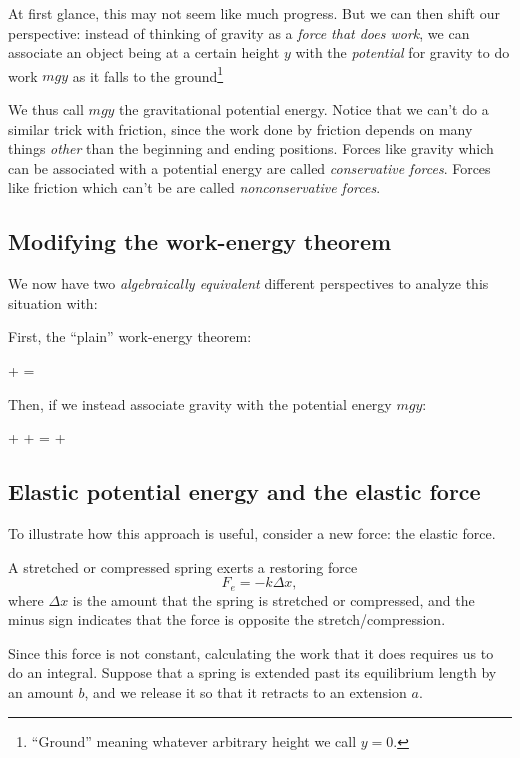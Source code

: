 \documentclass[10pt]{article}
\begin{document}
At first glance, this may not seem like much progress. But we can then shift our perspective: instead of thinking of gravity as a {\it force that does work}, we can associate an object being at a certain height $y$ with the {\it potential} for gravity to do work $mgy$ as it falls to the ground\footnote{``Ground'' meaning whatever arbitrary height we call $y=0$.} 

We thus call $mgy$ the gravitational potential energy. Notice that we can't do a similar trick with
friction, since the work done by friction depends on many things {\it other} than the beginning and ending positions. Forces like gravity which can be associated with a potential energy are called {\it conservative forces}. Forces like friction which can't be are called {\it nonconservative forces}.

\subsection{Modifying the work-energy theorem}

We now have two {\it algebraically equivalent} different perspectives to analyze this situation with:

First, the ``plain'' work-energy theorem:

 +  = 

Then, if we instead associate gravity with the potential energy $mgy$:

 +  +  =  + 

\subsection{Elastic potential energy and the elastic force}

To illustrate how this approach is useful, consider a new force: the elastic force.

A stretched or compressed spring exerts a restoring force $$F_e = -k\Delta x,$$ where $\Delta x$ is the amount that the spring is stretched or compressed, and the minus sign indicates that the force is opposite the stretch/compression.

Since this force is not constant, calculating the work that it does requires us to do an integral. Suppose that a spring is extended past its equilibrium length by an amount $b$, and we release it so that it retracts to an extension $a$.
\end{document}
